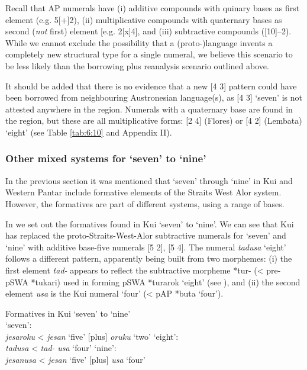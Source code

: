 \documentclass[output=paper]{LSP/langsci}
\begin{document}
Recall that AP numerals have (i) additive compounds with quinary bases as first element (e.g. 5[+]2), (ii) multiplicative compounds with quaternary bases as second (\textit{not} first) element [e.g. 2[x]4], and (iii) subtractive compounds ([10]--2). While we cannot exclude the possibility that a (proto-)language invents a completely new structural type for a single numeral, we believe this scenario to be less likely than the borrowing plus reanalysis scenario outlined above. 

It should be added that there is no evidence that a new [4 3] pattern could have been borrowed from neighbouring Austronesian language(s), as [4 3] `seven' is not attested anywhere in the region. Numerals with a quaternary base are found in the region, but these are all multiplicative forms: [2 4] (Flores) or [4 2] (Lembata) `eight' (see Table \ref{tab:6:10}  and Appendix II). 

\subsubsection{Other mixed systems for `seven' to `nine'}
In the previous section it was mentioned that `seven' through `nine' in Kui and Western Pantar include formative elements of the Straits West Alor system. However, the formatives are part of different systems, using a range of bases.

In  we set out the formatives found in Kui `seven' to `nine'. We can see that Kui has replaced the proto-Straits-West-Alor subtractive numerals for `seven' and `nine' with additive base-five numerals [5 2], [5 4]. The numeral \textit{tadusa} `eight' follows a different pattern, apparently being built from two morphemes: (i) the first element \textit{tad-} appears to reflect the subtractive morpheme *tur- ({\textless} pre-pSWA *tukari) used in forming pSWA *turarok `eight' (see ), and (ii) the second element \textit{usa} is the Kui numeral `four' ({\textless} pAP *buta `four'). 

 

\ea%
\label{ex:6:10}
 Formatives in Kui `seven' to `nine'\\
\ea `seven': \\
\textit{j}\textit{esaroku}  {\textless}  \textit{jesan} `five'   [plus]  \textit{oruku} `two'
\ex `eight':\\
\textit{tadusa}    {\textless}  \textit{tad-}      \textit{usa} `four'
\ex `nine':\\
\textit{je}\textit{sanusa}  {\textless}    \textit{jesan} `five'  [plus]  \textit{usa} `four'
\z
\z
\end{document}
